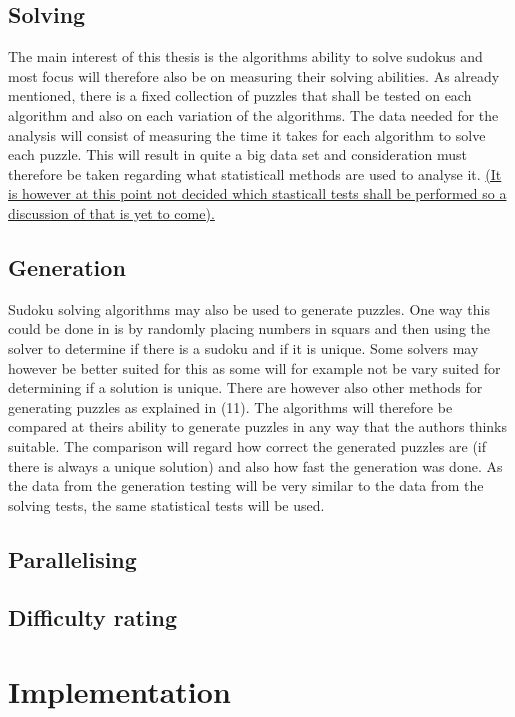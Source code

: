 \documentclass[a4paper,11pt]{kth-mag}
\begin{document}
\subsection{Solving}
The main interest of this thesis is the algorithms ability to solve sudokus and most focus will therefore also be on measuring their solving abilities. As already mentioned, there is a fixed collection of puzzles that shall be tested on each algorithm and also on each variation of the algorithms. The data needed for the analysis will consist of measuring the time it takes for each algorithm to solve each puzzle. This will result in quite a big data set and consideration must therefore be taken regarding what statisticall methods are used to analyse it. 
\underline{(It is however at this point not decided which stasticall tests shall be performed so a discussion of that is yet to come).}

\subsection{Generation}
Sudoku solving algorithms may also be used to generate puzzles. One way this could be done in is by randomly placing numbers in squars and then using the solver to determine if there is a sudoku and if it is unique. Some solvers may however be better suited for this as some will for example not be vary suited for determining if a solution is unique. There are however also other methods for generating puzzles as explained in (11). The algorithms will therefore be compared at theirs ability to generate puzzles in any way that the authors thinks suitable. The comparison will regard how correct the generated puzzles are (if there is always a unique solution) and also how fast the generation was done. As the data from the generation testing will be very similar to the data from the solving tests, the same statistical tests will be used.

\subsection{Parallelising}

\subsection{Difficulty rating}

\section{Implementation}
\end{document}
